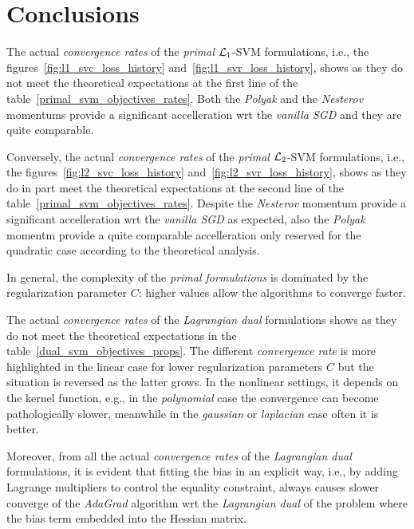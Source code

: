 \section{Conclusions}

The actual \emph{convergence rates} of the \emph{primal} $\protect \mathcal{L}_1$-SVM formulations, i.e., the figures~\ref{fig:l1_svc_loss_history} and~\ref{fig:l1_svr_loss_history}, shows as they do not meet the theoretical expectations at the first line of the table~\ref{primal_svm_objectives_rates}. Both the \emph{Polyak} and the \emph{Nesterov} momentums provide a significant accelleration wrt the \emph{vanilla SGD} and they are quite comparable.

Conversely, the actual \emph{convergence rates} of the \emph{primal} $\protect \mathcal{L}_2$-SVM formulations, i.e., the figures~\ref{fig:l2_svc_loss_history} and~\ref{fig:l2_svr_loss_history}, shows as they do in part meet the theoretical expectations at the second line of the table~\ref{primal_svm_objectives_rates}. Despite the \emph{Nesterov} momentum provide a significant accelleration wrt the \emph{vanilla SGD} as expected, also the \emph{Polyak} momentm provide a quite comparable accelleration only reserved for the quadratic case according to the theoretical analysis.

In general, the complexity of the \emph{primal formulations} is dominated by the regularization parameter $C$: higher values allow the algorithms to converge faster.

\bigskip

The actual \emph{convergence rates} of the \emph{Lagrangian dual} formulations shows as they do not meet the theoretical expectations in the table~\ref{dual_svm_objectives_props}. The different \emph{convergence rate} is more highlighted in the linear case for lower regularization parameters $C$ but the situation is reversed as the latter grows. In the nonlinear settings, it depends on the kernel function, e.g., in the \emph{polynomial} case the convergence can become pathologically slower, meanwhile in the \emph{gaussian} or \emph{laplacian} case often it is better.

Moreover, from all the actual \emph{convergence rates} of the \emph{Lagrangian dual} formulations, it is evident that fitting the bias in an explicit way, i.e., by adding Lagrange multipliers to control the equality constraint, always causes slower converge of the \emph{AdaGrad} algorithm wrt the \emph{Lagrangian dual} of the problem where the bias term embedded into the Hessian matrix.

